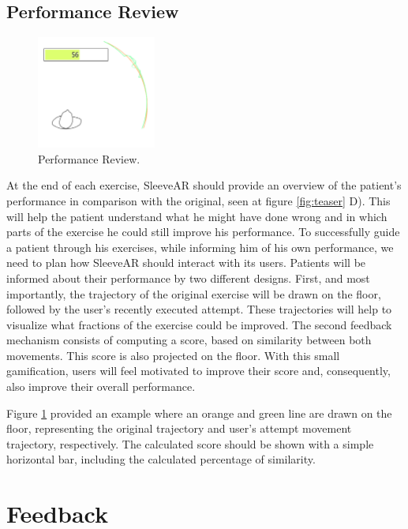 \subsection{Performance Review}

\begin{figure}
    \begin{center}
        \includegraphics[width=0.35\textwidth]{imgs/approach/performancereview}
    \end{center}
    \caption{Performance Review.}
    \label{fig:performancereview}
\end{figure}

At the end of each exercise, SleeveAR should provide an overview of the patient's performance in comparison with the original, seen at figure \ref{fig:teaser} D).
This will help the patient understand what he might have done wrong and in which parts of the exercise he could still improve his performance.
To successfully guide a patient through his exercises, while informing him of his own performance, we need to plan how SleeveAR should interact with its users. 
Patients will be informed about their performance by two different designs. 
First, and most importantly, the trajectory of the original exercise will be drawn on the floor, followed by the user's recently executed attempt. 
These trajectories will help to visualize what fractions of the exercise could be improved.
The second feedback mechanism consists of computing a score, based on similarity between both movements. This score is also projected on the floor. 
With this small gamification, users will feel motivated to improve their score and, consequently, also improve their overall performance.

Figure \ref{fig:performancereview} provided an example where an orange and green line are drawn on the floor, representing the original trajectory and user's attempt movement trajectory, respectively. 
The calculated score should be shown with a simple horizontal bar, including the calculated percentage of similarity.


\section{Feedback}
\label{sec:feedback}

